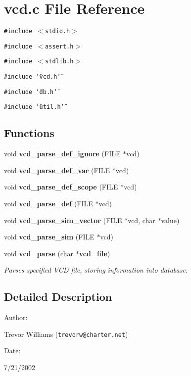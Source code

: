 \section{vcd.c File Reference}
\label{vcd_8c}
{\tt \#include $<$stdio.h$>$}\par
{\tt \#include $<$assert.h$>$}\par
{\tt \#include $<$stdlib.h$>$}\par
{\tt \#include \char`\"{}vcd.h\char`\"{}}\par
{\tt \#include \char`\"{}db.h\char`\"{}}\par
{\tt \#include \char`\"{}util.h\char`\"{}}\par
\subsection*{Functions}
\begin{CompactItemize}
\item 
void {\bf vcd\_\-parse\_\-def\_\-ignore} (FILE $\ast$vcd)
\item 
void {\bf vcd\_\-parse\_\-def\_\-var} (FILE $\ast$vcd)
\item 
void {\bf vcd\_\-parse\_\-def\_\-scope} (FILE $\ast$vcd)
\item 
void {\bf vcd\_\-parse\_\-def} (FILE $\ast$vcd)
\item 
void {\bf vcd\_\-parse\_\-sim\_\-vector} (FILE $\ast$vcd, char $\ast$value)
\item 
void {\bf vcd\_\-parse\_\-sim} (FILE $\ast$vcd)
\item 
void {\bf vcd\_\-parse} (char $\ast${\bf vcd\_\-file})
\begin{CompactList}\small\item\em Parses specified VCD file, storing information into database.\item\end{CompactList}\end{CompactItemize}


\subsection{Detailed Description}


\begin{Desc}
\item[Author: ]\par
Trevor Williams ({\tt trevorw@charter.net}) \end{Desc}
\begin{Desc}
\item[Date: ]\par
7/21/2002\end{Desc}


